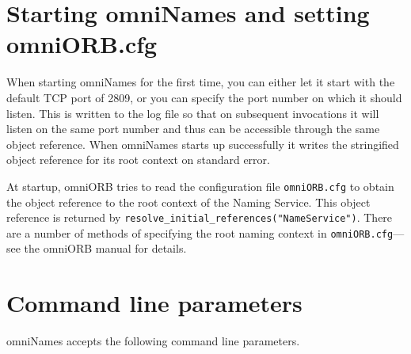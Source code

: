 \documentclass[a4paper,11pt,twoside]{article}
\begin{document}
\section{Starting omniNames and setting omniORB.cfg}

When starting omniNames for the first time, you can either let it
start with the default TCP port of 2809, or you can specify the port
number on which it should listen.  This is written to the log file so
that on subsequent invocations it will listen on the same port number
and thus can be accessible through the same object reference.  When
omniNames starts up successfully it writes the stringified object
reference for its root context on standard error.

At startup, omniORB tries to read the configuration file
\verb|omniORB.cfg| to obtain the object reference to the root context
of the Naming Service.  This object reference is returned by
\verb|resolve_initial_references("NameService")|. There are a number
of methods of specifying the root naming context in
\verb|omniORB.cfg|---see the omniORB manual for details.


\section{Command line parameters}

omniNames accepts the following command line parameters.

\vspace{\baselineskip}
\end{document}
